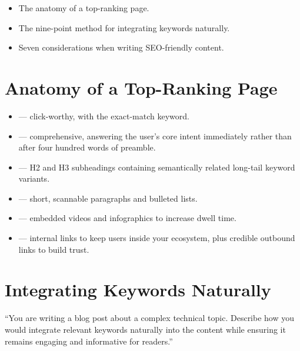 
\begin{learningoutcomes}
\begin{itemize}
\item The anatomy of a top-ranking page.
\item The nine-point method for integrating keywords naturally.
\item Seven considerations when writing SEO-friendly content.
\end{itemize}
\end{learningoutcomes}

\section{Anatomy of a Top-Ranking Page}

\begin{itemize}
\item {} --- click-worthy, with the exact-match keyword.
\item {} --- comprehensive, answering the user's core intent
      immediately rather than after four hundred words of preamble.
\item {} --- H2 and H3 subheadings containing semantically related
      long-tail keyword variants.
\item {} --- short, scannable paragraphs and bulleted lists.
\item {} --- embedded videos and infographics to increase dwell
      time.
\item {} --- internal links to keep users inside your ecosystem,
      plus credible outbound links to build trust.
\end{itemize}

\section{Integrating Keywords Naturally}

\begin{exambox}
``You are writing a blog post about a complex technical topic. Describe how you
would integrate relevant keywords naturally into the content while ensuring it
remains engaging and informative for readers.''
\end{exambox}

